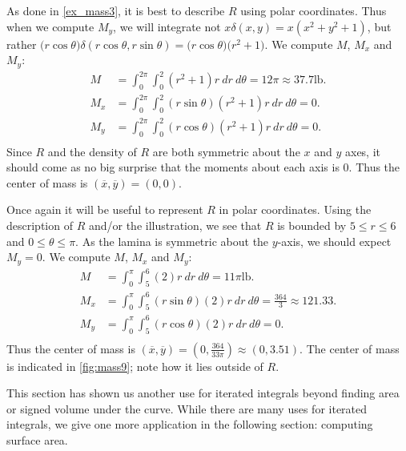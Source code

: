 {As done in \autoref{ex_mass3}, it is best to describe $R$ using polar coordinates.
Thus when we compute $M_y$, we will integrate not $x\delta(x,y) = x(x^2+y^2+1)$, but rather $\big(r\cos\theta\big)\delta(r\cos\theta,r\sin\theta) = \big(r\cos\theta\big)\big(r^2+1\big).$ We compute $M$, $M_x$ and $M_y$:
\begin{align*}
M &= \int_0^{2\pi}\int_0^2 (r^2+1)r\ dr\ d\theta = 12\pi\approx 37.7\text{lb}.\\
M_x &= \int_0^{2\pi}\int_0^2 (r\sin\theta)(r^2+1)r \ dr\ d\theta = 0.\\
M_y &= \int_0^{2\pi}\int_0^2 (r\cos\theta)(r^2+1)r \ dr\ d\theta = 0.\\
\end{align*}
Since $R$ and the density of $R$ are both symmetric about the $x$ and $y$ axes, it should come as no big surprise that the moments about each axis is 0. Thus the center of mass is $(\overline{x},\overline{y})=(0,0)$. }

{Once again it will be useful to represent $R$ in polar coordinates. Using the description of $R$ and/or the illustration, we see that $R$ is bounded by $5\leq r\leq 6$ and $0\leq\theta\leq\pi$. As the lamina is symmetric about the $y$-axis, we should expect $M_y=0$. We compute $M$, $M_x$ and $M_y$:
\begin{align*}
M &= \int_0^{\pi}\int_5^6 (2)r\ dr\ d\theta = 11\pi\text{lb}.\\
M_x &= \int_0^{\pi}\int_5^6 (r\sin\theta)(2)r\ dr\ d\theta = \frac{364}3\approx 121.33 .\\
M_y &= \int_0^{\pi}\int_5^6 (r\cos\theta)(2)r\ dr\ d\theta = 0.\\
\end{align*}
Thus the center of mass is $(\overline{x},\overline{y}) = \left(0,\frac{364}{33\pi}\right) \approx (0,3.51).$ The center of mass is indicated in \autoref{fig:mass9}; note how it lies outside of $R$.}

This section has shown us another use for iterated integrals beyond finding area or signed volume under the curve. While there are many uses for iterated integrals, we give one more application in the following section: computing surface area.

